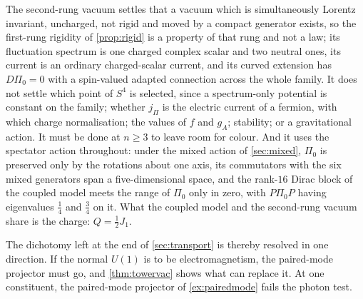 The second-rung vacuum settles that a vacuum which is simultaneously Lorentz invariant, uncharged, not rigid and moved by a compact generator exists, so the first-rung
rigidity of \cref{prop:rigid} is a property of that rung and not a law; its fluctuation spectrum is one charged complex scalar and two neutral ones, its current is an
ordinary charged-scalar current, and its curved extension has $D\Pi_0=0$ with a spin-valued adapted connection across the whole family. It does not settle which point
of $S^4$ is selected, since a spectrum-only potential is constant on the family; whether $j_\Pi$ is the electric current of a fermion, with which charge normalisation;
the values of $f$ and $g_A$; stability; or a gravitational action. It must be done at $n\ge3$ to leave room for colour. And it uses the spectator action throughout:
under the mixed action of \cref{sec:mixed}, $\Pi_0$ is preserved only by the rotations about one axis, its commutators with the six mixed generators span a
five-dimensional space, and the rank-$16$ Dirac block of the coupled model meets the range of $\Pi_0$ only in zero, with $P\Pi_0P$ having eigenvalues $\tfrac14$ and $\tfrac34$
on it. What the coupled model and the second-rung vacuum share is the charge: $Q=\tfrac12J_1$.

The dichotomy left at the end of \cref{sec:transport} is thereby resolved in one direction. If the normal $U(1)$ is to be electromagnetism, the paired-mode projector
must go, and \cref{thm:towervac} shows what can replace it. At one constituent, the paired-mode projector of \cref{ex:pairedmode} fails the photon test.
